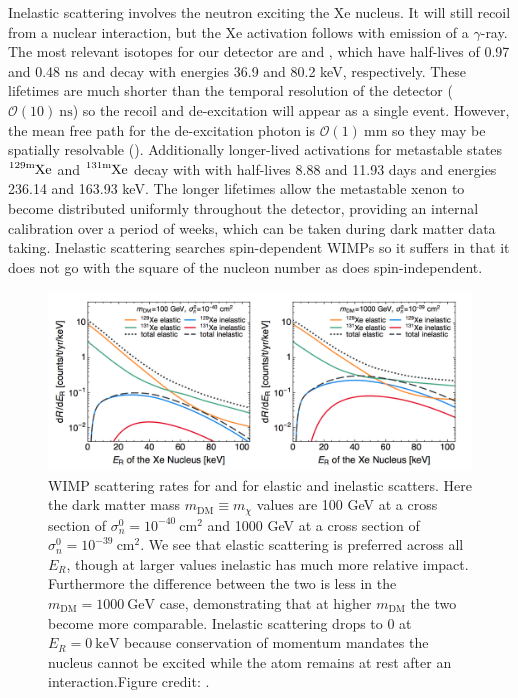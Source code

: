 Inelastic scattering involves the neutron exciting the Xe nucleus.  It will still recoil from a nuclear interaction, but the Xe
activation follows with emission of a $\gamma$-ray.  The most relevant isotopes for our detector are  and ,
which have half-lives of 0.97 and 0.48 ns and decay with energies 36.9 and 80.2 keV, respectively.  These lifetimes are much shorter
than the temporal resolution of the detector ($\mathcal{O}(10)\ \mathrm{ns}$) so the recoil and de-excitation will appear as a single
event.  However, the mean free path for the de-excitation photon is $\mathcal{O}(1)\ \mathrm{mm}$ so they may be spatially
resolvable ().  Additionally longer-lived activations for metastable
states $\ce{^{129\mathrm{m}}Xe}$ and $\ce{^{131\mathrm{m}}Xe}$ decay with with half-lives 8.88 and 11.93 days and energies 236.14 and 163.93 keV.  The
longer lifetimes allow the metastable xenon to become distributed uniformly throughout the detector, providing an internal calibration
over a period of weeks, which can be taken during dark matter data taking.  Inelastic scattering searches spin-dependent WIMPs so it
suffers in that it does not go with the square of the nucleon number as does spin-independent.

\begin{figure}
\includegraphics[width=\textwidth]{ElasticInelasticRates}
\caption{WIMP scattering rates for  and  for elastic and inelastic scatters.  Here the dark matter mass
$m_{\mathrm{DM}} \equiv m_{\chi}$ values are 100 GeV at a cross section of $\sigma_{n}^{0} = 10^{-40}\ \mathrm{cm^{2}}$ and
1000 GeV at a cross section of $\sigma_{n}^{0} = 10^{-39}\ \mathrm{cm^{2}}$. We see that elastic scattering is preferred across all
$E_{R}$, though at larger values inelastic has much more relative impact.  Furthermore the difference between the two is less in the
$m_{\mathrm{DM}} = 1000\ \mathrm{GeV}$ case, demonstrating that at higher $m_{\mathrm{DM}}$ the two become more comparable.  Inelastic
scattering drops to 0 at 
$E_{R} = 0\ \mathrm{keV}$ because conservation of momentum mandates the nucleus cannot be excited while the atom remains at rest
after an interaction.Figure credit: .}
\label{fig:nr_elastic_inelastic}
\end{figure}

